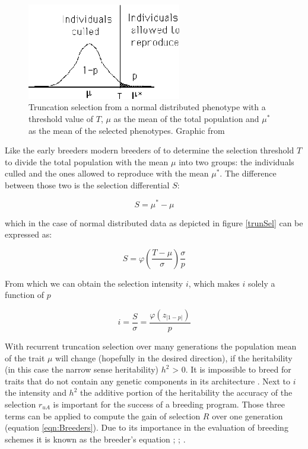 \begin{figure}[H]
   \centering \includegraphics[height=.25\textheight, width=0.6\textwidth]{Figures/truncSel} \decoRule
   \caption[Truncation selection of a normal distributed phenotype]{Truncation selection from a normal distributed phenotype with a threshold value of $T$, $\mu$ as the mean of the total population and $\mu^{\ast}$ as the mean of the selected phenotypes. Graphic from \cite{walsh2018short}}
 \label{fig:trunSel}
\end{figure}


Like the early breeders modern breeders of to determine the selection threshold $T$ to divide the total population with the mean $\mu$ into two groups: the individuals culled and the ones allowed to reproduce with the mean $\mu^{\ast}$. The difference between those two is the selection differential $S$:

\begin{equation}
  S =  \mu^{\ast} - \mu
\label{eqn:S}
\end{equation}

which in the case of normal distributed data as depicted in figure \ref{trunSel} can be expressed as:

\begin{equation}
S = \varphi (\frac{T - \mu}{\sigma}) \frac{\sigma}{p}
\end{equation}

From which we can obtain the selection intensity $i$, which makes $i$ solely a function of $p$ 

\begin{equation}
i = \frac{S}{\sigma} = \frac{\varphi (z_{|1-p|})}{p}
\end{equation}


With recurrent truncation selection over many generations the population mean of the trait $\mu$ will change
(hopefully in the desired direction), if the heritability (in this case the narrow sense heritability) $h^2$ >
0. It is impossible to breed for traits that do not contain any genetic components in its architecture
\cite{walsh2018}.  Next to $i$ the intensity and $h^2$ the additive portion of the heritability the accuracy
of the selection $r_{uA}$ is important for the success of a breeding program. Those three terms can be applied
to compute the gain of selection $R$ over one generation (equation \ref{eqn:Breeders}). Due to its importance
in the evaluation of breeding schemes it is known as the breeder's equation \cite{mousseau1987natural};
\cite{falconer1996}; \cite{kingsolver2001strength}.

